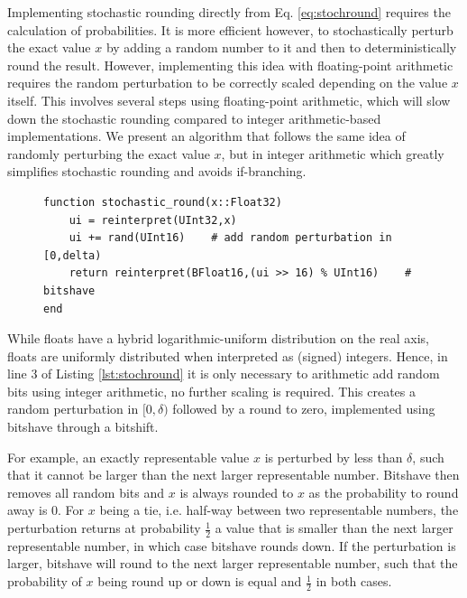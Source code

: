 Implementing stochastic rounding directly from Eq. \ref{eq:stochround} requires the calculation of probabilities. It is more efficient however, to stochastically
perturb the exact value $x$ by adding a random number to it and then to deterministically round the result. However, implementing this idea with
floating-point arithmetic requires the random perturbation to be correctly scaled depending on the value $x$ itself. This involves several steps using
floating-point arithmetic, which will slow down the stochastic rounding compared to integer arithmetic-based implementations. We present an algorithm
that follows the same idea of randomly perturbing the exact value $x$, but in integer arithmetic which greatly simplifies stochastic rounding and 
avoids if-branching.

\begin{figure}[tbhp]
\begin{lstlisting}[language=JuliaLocal, label=lst:stochround, caption={\textbf{Efficient bitwise stochastic rounding with integer
arithmetic as implemented by StochasticRounding.jl.} Example algorithm rounding Float32 to $n_f = 7$ mantissa bits as in Listing \ref{lst:bitshave}.
\texttt{rand(UInt16)} creates 16 random bits with equal probabilities that are interpreted as 16-bit unsigned integer.
Any pseudo random number generator can be used. To round the stochastically perturbed value, the bitshave operation is applied
using $>>16$, which shifts the trailing bits off the register.}]
function stochastic_round(x::Float32)
    ui = reinterpret(UInt32,x)
    ui += rand(UInt16)    # add random perturbation in [0,delta)
    return reinterpret(BFloat16,(ui >> 16) % UInt16)    # bitshave
end
\end{lstlisting}
\end{figure}
While floats have a hybrid logarithmic-uniform distribution on the real axis, floats are uniformly distributed when interpreted as (signed) integers.
Hence, in line 3 of Listing \ref{lst:stochround} it is only necessary to arithmetic add random bits using integer arithmetic, no further scaling is required.
This creates a random perturbation in $[0,\delta)$ followed by a round to zero, implemented using bitshave through a bitshift.

For example, an exactly representable value $x$ is perturbed by less than $\delta$, such that it cannot be larger than the next larger representable
number. Bitshave then removes all random bits and $x$ is always rounded to $x$ as the probability to round away is 0. For $x$ being a tie, i.e. half-way
between two representable numbers, the perturbation returns at probability $\tfrac{1}{2}$ a value that is smaller than the next larger
representable number, in which case bitshave rounds down. If the perturbation is larger, bitshave will round to the next larger representable number,
such that the probability of $x$ being round up or down is equal and $\tfrac{1}{2}$ in both cases.

